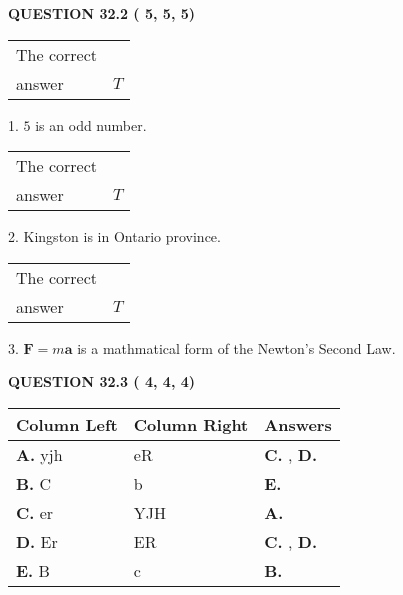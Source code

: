 \documentclass[12pt]{article}
\begin{document}
  
\vspace{0.2in}
  
{\textbf{\Large{QUESTION
32.2 
 (          5,          5,          5)
}}}
  
  
 
 
\noindent{}

 
\noindent\begin{tabular}{|l|l|}\hline The correct & \\
          answer &  %
$T$ \\ \hline \end{tabular}
1. $ %
5$ is an  %
odd number.
 
\noindent\begin{tabular}{|l|l|}\hline The correct & \\
          answer &  %
$T$ \\ \hline \end{tabular}
2.  %
Kingston is in  %
Ontario province.
 
\noindent\begin{tabular}{|l|l|}\hline The correct & \\
          answer &  %
$T$ \\ \hline \end{tabular}
3.  %
$\mathbf{F}=m\mathbf{a}$ is a mathmatical form of  %
the Newton's Second Law.
 
 
 
  
\vspace{0.2in}
  
{\textbf{\Large{QUESTION
32.3 
 (          4,          4,          4)
}}}
  
  
 
 
\noindent{}
  
  
\begin{tabular}{|l|l|l|}
 \hline
 Column Left & Column Right  & Answers       \\ 
 \hline
{\textbf{\large{
A.}}}
yjh
  & 
eR
 & 
{\textbf{\large{
C.}}}
, 
{\textbf{\large{
D.}}}
 \\ 
 \hline
{\textbf{\large{
B.}}}
C
  & 
b
 & 
{\textbf{\large{
E.}}}
 \\ 
 \hline
{\textbf{\large{
C.}}}
er
  & 
YJH
 & 
{\textbf{\large{
A.}}}
 \\ 
 \hline
{\textbf{\large{
D.}}}
Er
  & 
ER
 & 
{\textbf{\large{
C.}}}
, 
{\textbf{\large{
D.}}}
 \\ 
 \hline
{\textbf{\large{
E.}}}
B
  & 
c
 & 
{\textbf{\large{
B.}}}
 \\ 
 \hline
 \end{tabular}
  
\end{document}

